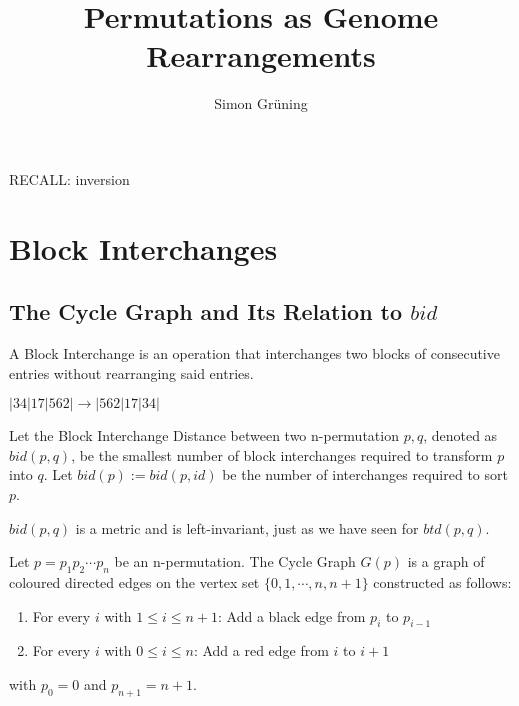 


\title{Permutations as Genome Rearrangements}
\author{Simon Gr\"uning}
\address[Simon Gr\"uning]{University of Zurich, R\"{a}mistrasse 71, 8006 Zurich}

\maketitle

\clearpage



\begin{remark}
RECALL: inversion
\end{remark}


\section{Block Interchanges}

\subsection{The Cycle Graph and Its Relation to $bid$}

\begin{definition}
A Block Interchange is an operation that interchanges two blocks of consecutive entries without rearranging said entries.
\end{definition}

\begin{example}
 $ |34|17|562| \rightarrow |562|17|34| $
\end{example}

\begin{definition}
Let the Block Interchange Distance between two n-permutation $p,q$, denoted as $bid(p,q)$, be the smallest number of block interchanges required to transform $p$ into $q$. Let $bid(p) := bid(p,id)$ be the number of interchanges required to sort $p$.
\end{definition}

\begin{remark}
$bid(p,q)$ is a metric and is left-invariant, just as we have seen for $btd(p,q)$.
\end{remark}

\begin{definition}
Let $p = p_1 p_2 \cdots p_n$ be an n-permutation. The  Cycle Graph $G(p)$ is a graph of coloured directed edges on the vertex set $\{ 0,1, \cdots ,n,n+1 \}$ constructed as follows:
\begin{enumerate}
\item For every $i$ with $1 \leq i \leq n+1$: Add a black edge from $p_i$ to $p_{i-1}$
\item For every $i$ with $0 \leq i \leq n$: Add a red edge from $i$ to $i+1$
\end{enumerate}
with $p_0 = 0$ and $p_{n+1} = n+1$.
\end{definition}

